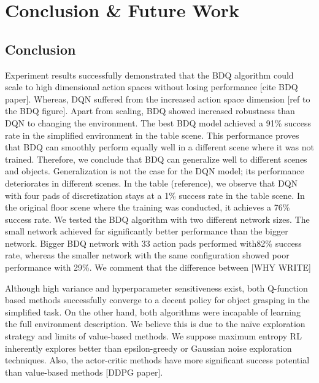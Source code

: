 
\chapter{Conclusion \& Future Work}\label{chapter:conclusion}

\section{Conclusion}


Experiment results successfully demonstrated that the BDQ algorithm could scale to high dimensional action spaces without losing performance [cite BDQ paper]. Whereas, DQN suffered from the increased action space dimension [ref to the BDQ figure]. Apart from scaling, BDQ showed increased robustness than DQN to changing the environment. The best BDQ model achieved a 91\% success rate in the simplified environment in the table scene. This performance proves that BDQ can smoothly perform equally well in a different scene where it was not trained. Therefore, we conclude that BDQ can generalize well to different scenes and objects. Generalization is not the case for the DQN model; its performance deteriorates in different scenes. In the table (reference), we observe that DQN with four pads of discretization stays at a 1\% success rate in the table scene. In the original floor scene where the training was conducted, it achieves a 76\% success rate.
We tested the BDQ algorithm with two different network sizes. The small network achieved far significantly better performance than the bigger network. Bigger BDQ network with 33 action pads performed with82\% success rate, whereas the smaller network with the same configuration showed poor performance with 29\%. We comment that the difference between [WHY WRITE]

Although high variance and hyperparameter sensitiveness exist, both Q-function based methods successfully converge to a decent policy for object grasping in the simplified task. On the other hand, both algorithms were incapable of learning the full environment description. We believe this is due to the naïve exploration strategy and limits of value-based methods. We suppose maximum entropy RL inherently explores better than epsilon-greedy or Gaussian noise exploration techniques. Also, the actor-critic methods have more significant success potential than value-based methods [DDPG paper]. 

